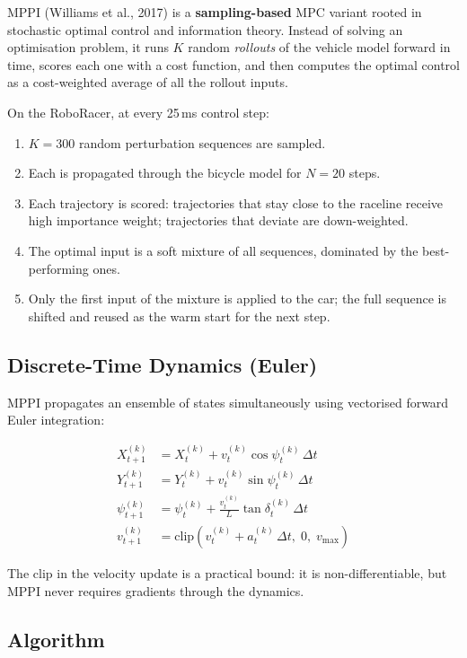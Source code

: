 \documentclass[11pt]{article}
\begin{document}
MPPI (Williams et al., 2017) is a \textbf{sampling-based} MPC variant rooted in
stochastic optimal control and information theory.  Instead of solving an
optimisation problem, it runs $K$ random \emph{rollouts} of the vehicle model
forward in time, scores each one with a cost function, and then computes the
optimal control as a cost-weighted average of all the rollout inputs.

On the RoboRacer, at every 25\,ms control step:
\begin{enumerate}
  \item $K = 300$ random perturbation sequences are sampled.
  \item Each is propagated through the bicycle model for $N = 20$ steps.
  \item Each trajectory is scored: trajectories that stay close to the raceline
        receive high importance weight; trajectories that deviate are down-weighted.
  \item The optimal input is a soft mixture of all sequences, dominated by the
        best-performing ones.
  \item Only the first input of the mixture is applied to the car; the full
        sequence is shifted and reused as the warm start for the next step.
\end{enumerate}

\subsection{Discrete-Time Dynamics (Euler)}

MPPI propagates an ensemble of states simultaneously using vectorised forward
Euler integration:

\begin{align}
X_{t+1}^{(k)}   &= X_t^{(k)} + v_t^{(k)}\cos\psi_t^{(k)}\,\Delta t \\
Y_{t+1}^{(k)}   &= Y_t^{(k)} + v_t^{(k)}\sin\psi_t^{(k)}\,\Delta t \\
\psi_{t+1}^{(k)} &= \psi_t^{(k)} + \frac{v_t^{(k)}}{L}\tan\delta_t^{(k)}\,\Delta t \\
v_{t+1}^{(k)}   &= \mathrm{clip}\!\left(v_t^{(k)} + a_t^{(k)}\,\Delta t,\; 0,\; v_{\max}\right)
\end{align}

The $\mathrm{clip}$ in the velocity update is a practical bound: it is
non-differentiable, but MPPI never requires gradients through the dynamics.

\subsection{Algorithm}
\end{document}
